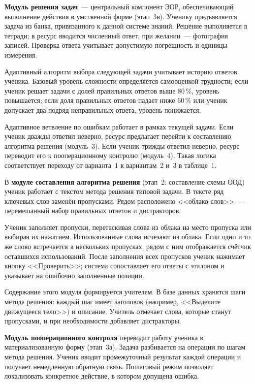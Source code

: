 \documentclass[14pt]{extarticle}
\begin{document}
\textbf{Модуль решения задач}~--- центральный компонент ЭОР,
обеспечивающий выполнение действия в умственной форме (этап~3в).
Ученику предъявляется задача из банка, привязанного к данной системе знаний.
Решение выполняется в тетради; в ресурс вводится численный ответ,
при желании~--- фотография записей. Проверка ответа учитывает
допустимую погрешность и единицы измерения.

Адаптивный алгоритм выбора следующей задачи учитывает историю ответов ученика.
Базовый уровень сложности определяется самооценкой трудности; если ученик
решает задачи с долей правильных ответов выше 80\,\%, уровень повышается;
если доля правильных ответов падает ниже 60\,\% или ученик допускает два
подряд неправильных ответа, уровень понижается.

Адаптивное ветвление по ошибкам работает в рамках текущей задачи.
Если ученик дважды ответил неверно, ресурс предлагает перейти к составлению
алгоритма решения (модуль~3). Если ученик трижды ответил неверно, ресурс
переводит его к пооперационному контролю (модуль~4). Такая логика
соответствует переходу от варианта~1 к вариантам~2 и~3 в таблице~1.

В \textbf{модуле составления алгоритма решения} (этап~2: составление
схемы ООД) ученик работает с текстом метода решения типовой задачи.
В тексте ряд ключевых слов заменён пропусками. Рядом расположено
<<облако слов>>~--- перемешанный набор правильных ответов и дистракторов.

Ученик заполняет пропуски, перетаскивая слова из облака на место пропуска
или выбирая их нажатием. Использованные слова исчезают из облака.
Если одно и то же слово встречается в нескольких пропусках, рядом
с ним отображается счётчик оставшихся использований.
После заполнения всех пропусков ученик нажимает кнопку <<Проверить>>;
система сопоставляет его ответы с эталоном и указывает
на ошибочно заполненные позиции.

Содержание этого модуля формируется учителем.
В базе данных хранятся шаги метода решения: каждый шаг имеет заголовок
(например, <<Выделите движущееся тело>>) и описание. Учитель отмечает слова,
которые станут пропусками, и при необходимости добавляет дистракторы.

\textbf{Модуль пооперационного контроля} переводит работу ученика
в материализованную форму (этап~3а). Задача разбивается на операции
по шагам метода решения. Ученик вводит промежуточный результат
каждой операции и получает немедленную обратную связь. Пошаговый
режим позволяет локализовать конкретное действие, в котором
допущена ошибка.
\end{document}

